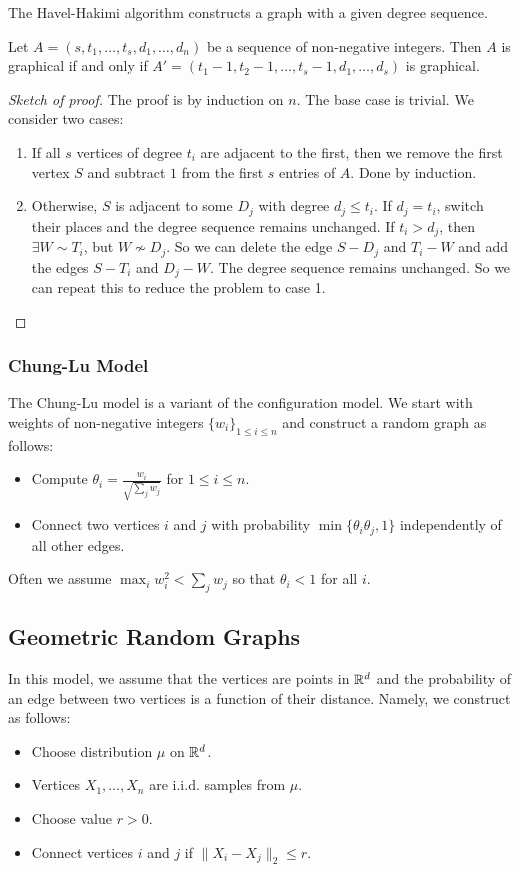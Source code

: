 \documentclass{article}
\begin{document}
The Havel-Hakimi algorithm constructs a graph with a given degree sequence.
\begin{theorem}
    Let $A=(s, t_1, \ldots, t_s, d_1, \ldots, d_n)$ be a sequence of non-negative integers. Then $A$ is graphical if and only if $A'=(t_1-1, t_2-1, \ldots, t_s-1, d_1, \ldots, d_s)$ is graphical.
\end{theorem}
\begin{proof}[Sketch of proof]
    The proof is by induction on $n$. The base case is trivial. We consider two cases: 
    \begin{enumerate}
        \item If all $s$ vertices of degree $t_i$ are adjacent to the first, then we remove the first vertex $S$ and subtract $1$ from the first $s$ entries of $A$. Done by induction.
        \item Otherwise, $S$ is adjacent to some $D_j$ with degree $d_j \leq t_i$. If $d_j=t_i$, switch their places and the degree sequence remains unchanged. If $t_i>d_j$, then $\exists W \sim T_i$, but $W \nsim D_j$. So we can delete the edge $S-D_j$ and $T_i-W$ and add the edges $S-T_i$ and $D_j-W$. The degree sequence remains unchanged. So we can repeat this to reduce the problem to case 1.
    \end{enumerate}
\end{proof}


\subsubsection{Chung-Lu Model}

The Chung-Lu model is a variant of the configuration model. We start with weights of non-negative integers $\{w_i\}_{1\leq i \leq n}$ and construct a random graph as follows:
\begin{itemize}
    \item Compute $\theta_i = \frac{w_i}{\sqrt{\sum_j w_j}}$ for $1\leq i \leq n$.
    \item Connect two vertices $i$ and $j$ with probability $\min \{\theta_i \theta_j, 1\}$ independently of all other edges.
\end{itemize}

Often we assume $\max_i w_i^2 < \sum_j w_j$ so that $\theta_i < 1$ for all $i$.

\subsection{Geometric Random Graphs}
In this model, we assume that the vertices are points in $\mathbb{R}^d$ and the probability of an edge between two vertices is a function of their distance. Namely, we construct as follows:
\begin{itemize}
    \item Choose distribution $\mu$ on $\mathbb{R}^d$.
    \item Vertices $X_1,\ldots,X_n$ are i.i.d. samples from $\mu$.
    \item Choose value $r>0$.
    \item Connect vertices $i$ and $j$ if $\|X_i-X_j\|_2\leq r$.
\end{itemize}
\end{document}

